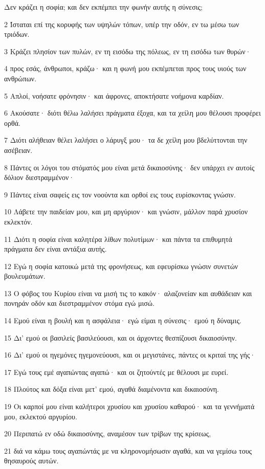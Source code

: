 \par Δεν κράζει η σοφία; και δεν εκπέμπει την φωνήν αυτής η σύνεσις;
\par 2 Ίσταται επί της κορυφής των υψηλών τόπων, υπέρ την οδόν, εν τω μέσω των τριόδων.
\par 3 Κράζει πλησίον των πυλών, εν τη εισόδω της πόλεως, εν τη εισόδω των θυρών·
\par 4 προς εσάς, άνθρωποι, κράζω· και η φωνή μου εκπέμπεται προς τους υιούς των ανθρώπων.
\par 5 Απλοί, νοήσατε φρόνησιν· και άφρονες, αποκτήσατε νοήμονα καρδίαν.
\par 6 Ακούσατε· διότι θέλω λαλήσει πράγματα έξοχα, και τα χείλη μου θέλουσι προφέρει ορθά.
\par 7 Διότι αλήθειαν θέλει λαλήσει ο λάρυγξ μου· τα δε χείλη μου βδελύττονται την ασέβειαν.
\par 8 Πάντες οι λόγοι του στόματός μου είναι μετά δικαιοσύνης· δεν υπάρχει εν αυτοίς δόλιον διεστραμμένον·
\par 9 Πάντες είναι σαφείς εις τον νοούντα και ορθοί εις τους ευρίσκοντας γνώσιν.
\par 10 Λάβετε την παιδείαν μου, και μη αργύριον· και γνώσιν, μάλλον παρά χρυσίον εκλεκτόν.
\par 11 Διότι η σοφία είναι καλητέρα λίθων πολυτίμων· και πάντα τα επιθυμητά πράγματα δεν είναι αντάξια αυτής.
\par 12 Εγώ η σοφία κατοικώ μετά της φρονήσεως, και εφευρίσκω γνώσιν συνετών βουλευμάτων.
\par 13 Ο φόβος του Κυρίου είναι να μισή τις το κακόν· αλαζονείαν και αυθάδειαν και πονηράν οδόν και διεστραμμένον στόμα εγώ μισώ.
\par 14 Εμού είναι η βουλή και η ασφάλεια· εγώ είμαι η σύνεσις· εμού η δύναμις.
\par 15 Δι' εμού οι βασιλείς βασιλεύουσι, και οι άρχοντες θεσπίζουσι δικαιοσύνην.
\par 16 Δι' εμού οι ηγεμόνες ηγεμονεύουσι, και οι μεγιστάνες, πάντες οι κριταί της γής·
\par 17 Εγώ τους εμέ αγαπώντας αγαπώ· και οι ζητούντές με θέλουσι με ευρεί.
\par 18 Πλούτος και δόξα είναι μετ' εμού, αγαθά διαμένοντα και δικαιοσύνη.
\par 19 Οι καρποί μου είναι καλήτεροι χρυσίου και χρυσίου καθαρού· και τα γεννήματά μου, εκλεκτού αργυρίου.
\par 20 Περιπατώ εν οδώ δικαιοσύνης, αναμέσον των τρίβων της κρίσεως,
\par 21 διά να κάμω τους αγαπώντάς με να κληρονομήσωσιν αγαθά, και να γεμίσω τους θησαυρούς αυτών.
